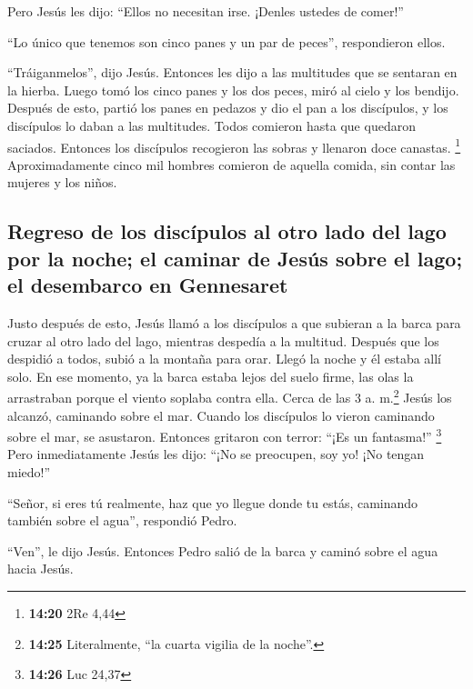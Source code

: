  Pero Jesús les dijo: ``Ellos no necesitan irse. ¡Denles
ustedes de comer!''

 ``Lo único que tenemos son cinco panes y un par de
peces'', respondieron ellos.

 ``Tráiganmelos'', dijo Jesús.  Entonces
les dijo a las multitudes que se sentaran en la hierba. Luego tomó los
cinco panes y los dos peces, miró al cielo y los bendijo. Después de
esto, partió los panes en pedazos y dio el pan a los discípulos, y los
discípulos lo daban a las multitudes.  Todos comieron
hasta que quedaron saciados. Entonces los discípulos recogieron las
sobras y llenaron doce canastas. \footnote{\textbf{14:20} 2Re 4,44}
 Aproximadamente cinco mil hombres comieron de aquella
comida, sin contar las mujeres y los niños.

\hypertarget{regreso-de-los-discuxedpulos-al-otro-lado-del-lago-por-la-noche-el-caminar-de-jesuxfas-sobre-el-lago-el-desembarco-en-gennesaret}{%
\subsection{Regreso de los discípulos al otro lado del lago por la
noche; el caminar de Jesús sobre el lago; el desembarco en
Gennesaret}\label{regreso-de-los-discuxedpulos-al-otro-lado-del-lago-por-la-noche-el-caminar-de-jesuxfas-sobre-el-lago-el-desembarco-en-gennesaret}}

 Justo después de esto, Jesús llamó a los discípulos a
que subieran a la barca para cruzar al otro lado del lago, mientras
despedía a la multitud.  Después que los despidió a
todos, subió a la montaña para orar. Llegó la noche y él estaba allí
solo.  En ese momento, ya la barca estaba lejos del suelo
firme, las olas la arrastraban porque el viento soplaba contra ella.
 Cerca de las 3 a. m.\footnote{\textbf{14:25}
  Literalmente, ``la cuarta vigilia de la noche''.} Jesús los alcanzó,
caminando sobre el mar.  Cuando los discípulos lo vieron
caminando sobre el mar, se asustaron. Entonces gritaron con terror:
``¡Es un fantasma!'' \footnote{\textbf{14:26} Luc 24,37} 
Pero inmediatamente Jesús les dijo: ``¡No se preocupen, soy yo! ¡No
tengan miedo!''

 ``Señor, si eres tú realmente, haz que yo llegue donde
tu estás, caminando también sobre el agua'', respondió Pedro.

 ``Ven'', le dijo Jesús. Entonces Pedro salió de la barca
y caminó sobre el agua hacia Jesús.

